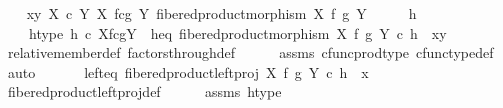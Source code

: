 \begin{isabellebody}
%
\isadelimproof
%
\endisadelimproof
%
\isatagproof
{}\isamarkupfalse%
\isanewline
\ \ \isamarkupfalse%
\ {\isachardoublequoteopen}{\isasymlangle}x{\isacharcomma}{\kern0pt}y{\isasymrangle}\ {\isasymin}\isactrlbsub X\ {\isasymtimes}\isactrlsub c\ Y\isactrlesub \ {\isacharparenleft}{\kern0pt}X\ \isactrlbsub f\isactrlesub {\isasymtimes}\isactrlsub c\isactrlbsub g\isactrlesub \ Y{\isacharcomma}{\kern0pt}\ fibered{\isacharunderscore}{\kern0pt}product{\isacharunderscore}{\kern0pt}morphism\ X\ f\ g\ Y{\isacharparenright}{\kern0pt}{\isachardoublequoteclose}\isanewline
\ \ \isamarkupfalse%
\ \isamarkupfalse%
\ h\ \isanewline
\ \ \ \ h{\isacharunderscore}{\kern0pt}type{\isacharcolon}{\kern0pt}\ {\isachardoublequoteopen}h\ {\isasymin}\isactrlsub c\ X\isactrlbsub f\isactrlesub {\isasymtimes}\isactrlsub c\isactrlbsub g\isactrlesub Y{\isachardoublequoteclose}\ \ h{\isacharunderscore}{\kern0pt}eq{\isacharcolon}{\kern0pt}\ {\isachardoublequoteopen}fibered{\isacharunderscore}{\kern0pt}product{\isacharunderscore}{\kern0pt}morphism\ X\ f\ g\ Y\ {\isasymcirc}\isactrlsub c\ h\ {\isacharequal}{\kern0pt}\ {\isasymlangle}x{\isacharcomma}{\kern0pt}y{\isasymrangle}{\isachardoublequoteclose}\isanewline
\ \ \ \ \isamarkupfalse%
\ relative{\isacharunderscore}{\kern0pt}member{\isacharunderscore}{\kern0pt}def{}\ factors{\isacharunderscore}{\kern0pt}through{\isacharunderscore}{\kern0pt}def\isanewline
\ \ \ \ \isamarkupfalse%
\ assms{\isacharparenleft}{\kern0pt}{}{\isacharcomma}{\kern0pt}{}{\isacharparenright}{\kern0pt}\ cfunc{\isacharunderscore}{\kern0pt}prod{\isacharunderscore}{\kern0pt}type\ cfunc{\isacharunderscore}{\kern0pt}type{\isacharunderscore}{\kern0pt}def\ \isamarkupfalse%
\ auto\isanewline
\ \ \isanewline
\ \ \isamarkupfalse%
\ left{\isacharunderscore}{\kern0pt}eq{\isacharcolon}{\kern0pt}\ {\isachardoublequoteopen}fibered{\isacharunderscore}{\kern0pt}product{\isacharunderscore}{\kern0pt}left{\isacharunderscore}{\kern0pt}proj\ X\ f\ g\ Y\ {\isasymcirc}\isactrlsub c\ h\ {\isacharequal}{\kern0pt}\ x{\isachardoublequoteclose}\isanewline
\ \ \ \ \isamarkupfalse%
\ fibered{\isacharunderscore}{\kern0pt}product{\isacharunderscore}{\kern0pt}left{\isacharunderscore}{\kern0pt}proj{\isacharunderscore}{\kern0pt}def\isanewline
\ \ \ \ \isamarkupfalse%
\ assms\ h{\isacharunderscore}{\kern0pt}type\isanewline
\ \ \ \ \isamarkupfalse%

\end{isabellebody}
